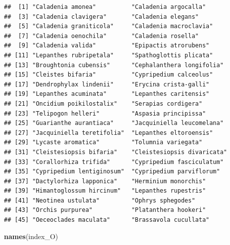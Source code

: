 \documentclass[
]{book}
\newenvironment{Shaded}{\begin{snugshade}}{\end{snugshade}}
\newcommand{\FunctionTok}[1]{\textcolor[rgb]{0.13,0.29,0.53}{\textbf{#1}}}
\newcommand{\NormalTok}[1]{#1}
\newcommand{\SpecialCharTok}[1]{\textcolor[rgb]{0.81,0.36,0.00}{\textbf{#1}}}
\theoremstyle{definition}
\theoremstyle{definition}
\theoremstyle{definition}
\theoremstyle{definition}
\theoremstyle{remark}
\begin{document}
\begin{Shaded}
\end{Shaded}

\begin{verbatim}
##  [1] "Caladenia amonea"          "Caladenia argocalla"      
##  [3] "Caladenia clavigera"       "Caladenia elegans"        
##  [5] "Caladenia graniticola"     "Caladenia macroclavia"    
##  [7] "Caladenia oenochila"       "Caladenia rosella"        
##  [9] "Caladenia valida"          "Epipactis atrorubens"     
## [11] "Lepanthes rubripetala"     "Spathoglottis plicata"    
## [13] "Broughtonia cubensis"      "Cephalanthera longifolia" 
## [15] "Cleistes bifaria"          "Cypripedium calceolus"    
## [17] "Dendrophylax lindenii"     "Erycina crista-galli"     
## [19] "Lepanthes acuminata"       "Lepanthes caritensis"     
## [21] "Oncidium poikilostalix"    "Serapias cordigera"       
## [23] "Telipogon helleri"         "Aspasia principissa"      
## [25] "Guarianthe aurantiaca"     "Jacquiniella leucomelana" 
## [27] "Jacquiniella teretifolia"  "Lepanthes eltoroensis"    
## [29] "Lycaste aromatica"         "Tolumnia variegata"       
## [31] "Cleistesiopsis bifaria"    "Cleistesiopsis divaricata"
## [33] "Corallorhiza trifida"      "Cypripedium fasciculatum" 
## [35] "Cypripedium lentiginosum"  "Cypripedium parviflorum"  
## [37] "Dactylorhiza lapponica"    "Herminium monorchis"      
## [39] "Himantoglossum hircinum"   "Lepanthes rupestris"      
## [41] "Neotinea ustulata"         "Ophrys sphegodes"         
## [43] "Orchis purpurea"           "Platanthera hookeri"      
## [45] "Oeceoclades maculata"      "Brassavola cucullata"
\end{verbatim}

\begin{Shaded}
\begin{Highlighting}[]
\FunctionTok{names}\NormalTok{(index\_O)}
\end{Highlighting}
\end{Shaded}
\end{document}
